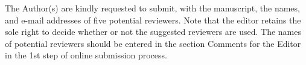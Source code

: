 \documentclass{article}
\begin{document}
The Author(s) are kindly requested to submit, with the manuscript, the names, and e-mail addresses of five potential reviewers. Note that the editor retains the sole right to decide whether or not the suggested reviewers are used. The names of potential reviewers should be entered in the section Comments for the Editor in the 1st step of online submission process.
\end{document}
